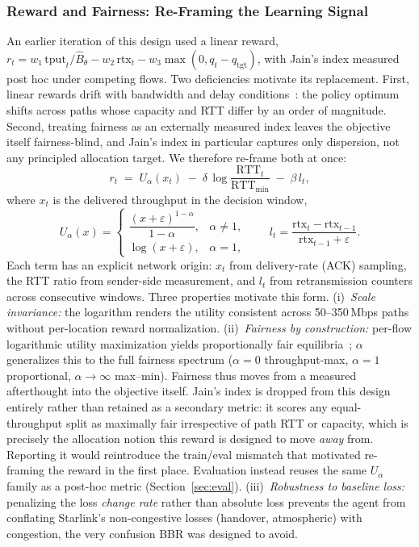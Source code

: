\documentclass[journal]{IEEEtran}
\begin{document}
\subsubsection{Reward and Fairness: Re-Framing the Learning Signal}
An earlier iteration of this design used a linear reward,
$r_t = w_1\,\mathrm{tput}_t/\hat{B}_\theta - w_2\,\mathrm{rtx}_t -
w_3\max(0, q_t-q_{\mathrm{tgt}})$, with Jain's index measured post hoc
under competing flows. Two deficiencies motivate its replacement. First,
linear rewards drift with bandwidth and delay
conditions~\cite{yu2026dnccq}: the policy optimum shifts across paths whose
capacity and RTT differ by an order of magnitude. Second, treating fairness
as an externally measured index leaves the objective itself
fairness-blind, and Jain's index in particular captures only dispersion,
not any principled allocation target. We therefore re-frame both at once:
\begin{equation}
r_t \;=\; U_\alpha(x_t) \;-\; \delta\,
\log\!\frac{\mathrm{RTT}_t}{\mathrm{RTT}_{\min}} \;-\; \beta\, l_t,
\label{eq:reward}
\end{equation}
where $x_t$ is the delivered throughput in the decision window,
\begin{equation}
U_\alpha(x)=
\begin{cases}
\dfrac{(x+\varepsilon)^{1-\alpha}}{1-\alpha}, & \alpha\neq 1,\\[6pt]
\log(x+\varepsilon), & \alpha=1,
\end{cases}
\qquad
l_t=\frac{\mathrm{rtx}_t-\mathrm{rtx}_{t-1}}{\mathrm{rtx}_{t-1}+\varepsilon}.
\end{equation}
Each term has an explicit network origin: $x_t$ from delivery-rate (ACK)
sampling, the RTT ratio from sender-side measurement, and $l_t$ from
retransmission counters across consecutive windows. Three properties
motivate this form. (i)~\emph{Scale invariance:} the logarithm renders the
utility consistent across 50--350\,Mbps paths without per-location reward
normalization. (ii)~\emph{Fairness by construction:} per-flow logarithmic
utility maximization yields proportionally fair
equilibria~\cite{kelly1998, mo2000}; $\alpha$ generalizes this to the full
fairness spectrum ($\alpha{=}0$ throughput-max, $\alpha{=}1$ proportional,
$\alpha{\to}\infty$ max--min). Fairness thus moves from a measured
afterthought into the objective itself. Jain's index is dropped from this
design entirely rather than retained as a secondary metric: it scores any
equal-throughput split as maximally fair irrespective of path RTT or
capacity, which is precisely the allocation notion this reward is designed
to move \emph{away} from. Reporting it would reintroduce the train/eval
mismatch that motivated re-framing the reward in the first place. Evaluation
instead reuses the same $U_\alpha$ family as a post-hoc metric
(Section~\ref{sec:eval}). (iii)~\emph{Robustness to baseline loss:}
penalizing the loss \emph{change rate} rather than absolute loss prevents
the agent from conflating Starlink's non-congestive losses (handover,
atmospheric) with congestion, the very confusion BBR was designed to
avoid.
\end{document}
